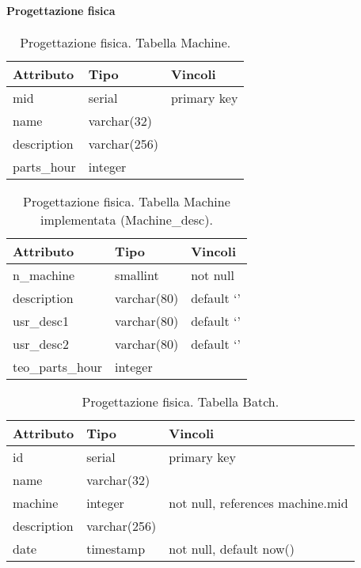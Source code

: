 \paragraph{Progettazione fisica}
\begin{table}
\begin{tabular}{| l | l | l |}
  \hline Attributo & Tipo & Vincoli\\
  \hline mid & serial & primary key \\
  \hline name & varchar(32) & \\
  \hline description & varchar(256) & \\
  \hline parts\_hour & integer & \\
  \hline
\end{tabular}
\label{tab:machinetable}
\caption[Documentazione ER: relazioni]{Progettazione fisica. Tabella Machine.}
\end{table}

\begin{table}
\begin{tabular}{| l | l | l |}
  \hline Attributo & Tipo & Vincoli\\
  \hline n\_machine & smallint & not null \\
  \hline description & varchar(80) & default \lq\rq\\
  \hline usr\_desc1 & varchar(80) & default \lq\rq\\
  \hline usr\_desc2 & varchar(80) & default \lq\rq\\
  \hline teo\_parts\_hour & integer & \\
  \hline
\end{tabular}
\label{tab:machinetableimpl}
\caption[Documentazione ER: relazioni]{Progettazione fisica. Tabella Machine implementata (Machine\_desc).}
\end{table}

\begin{table}
\begin{tabular}{| l | l | l |}
  \hline Attributo & Tipo & Vincoli\\
  \hline id & serial & primary key \\
  \hline name & varchar(32) & \\
  \hline machine & integer & not null, references machine.mid \\
  \hline description & varchar(256) & \\
  \hline date & timestamp & not null, default now()\\
  \hline
\end{tabular}
\label{tab:batchtable}
\caption[Documentazione ER: relazioni]{Progettazione fisica. Tabella Batch.}
\end{table}

